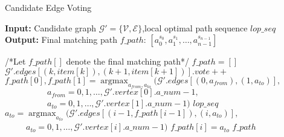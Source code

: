 \documentclass[a4paper,12pt]{article}
\begin{document}
 
\begin{CJK}{UTF8}{gbsn} 
\begin{algorithm} 
    \setcounter{algorithm}{1}
    \caption{Candidate Edge Voting} 
    \hspace*{0.02in} {\bf Input:} Candidate graph $\mathcal{G}'=\{\mathcal{V},\mathcal{E}\}$,local optimal path sequence $lop\_seq$ \\ 
    \hspace*{0.02in} {\bf Output:} Final matching path $f\_path$: $[a_0^{s_0},a_1^{s_1},\dots,a_{n-1}^{s_{n-1}}]$
    \begin{algorithmic}[1]
    \iffalse
    \fi
	\State /*Let $f\_path[]$ denote the final matching path*/
	\State $f\_path=[]$
					\State $\mathcal{G}'.edges[(k,item[k]),(k+1,item[k+1])].vote++$
				\EndFor
			\EndFor
        \EndFor
	\State $f\_path[0],f\_path[1]=\mathop{\mathrm{argmax}}_{a_{from},a_{to}}{(\mathcal{G}'.edges[(0,a_{from}),(1,a_{to})],}$
	\State $\qquad \qquad \quad a_{from}=0,1,\dots,\mathcal{G}'.vertex[0].a\_num-1,$
	\State $\qquad \qquad \quad a_{to}=0,1,\dots,\mathcal{G}'.vertex[1].a\_num-1)$
	\State \Return $lop\_seq$
		\State $a_{to} = \mathop{\mathrm{argmax}}_{a_{to}}{(\mathcal{G}'.edges[(i-1,f\_path[i-1]),(i,a_{to})],}$
		\State $\qquad \, \, \, a_{to}=0,1,\dots,\mathcal{G}'.vertex[i].a\_num-1)$
		\State $f\_path[i]=a_{to}$
	\EndFor
	\State \Return $f\_path$
    \end{algorithmic} 
\end{algorithm}
\end{CJK} 
\end{document}
